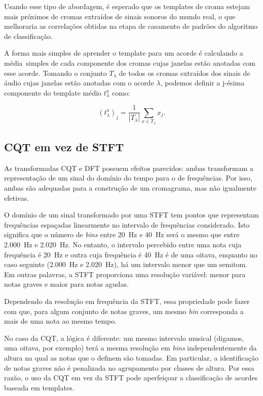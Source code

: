         Usando esse tipo de abordagem, é esperado que os templates de croma estejam mais próximos de cromas extraídos de sinais sonoros do mundo real, o que melhoraria as correlações obtidas na etapa de casamento de padrões do algoritmo de classificação.

        A forma mais simples de aprender o template para um acorde é calculando a média~simples de cada componente dos cromas cujas janelas estão anotadas com esse acorde. Tomando o conjunto $T_\lambda$ de todos os cromas extraídos dos sinais de áudio cujas janelas estão anotadas com o acorde $\lambda$, podemos definir a j-ésima componente do template médio $t_\lambda^a$ como:

        \[
            (t_\lambda^a)_j = \frac{1}{|T_\lambda|} \sum_{x \in T_\lambda} x_j\mbox{.}
        \]


    \subsection{CQT em vez de STFT}
        As transformadas CQT e DFT possuem efeitos parecidos: ambas transformam a representação de um sinal do domínio do tempo para o de frequências. Por isso, ambas são adequadas para a construção de um cromagrama, mas não igualmente efetivas.

        O domínio de um sinal transformado por uma STFT tem pontos que representam frequências espaçadas linearmente no intervalo de frequências considerado. Isto significa que o número de \textit{bins} entre 20~Hz e 40~Hz será o mesmo que entre 2.000~Hz e 2.020~Hz. No entanto, o intervalo percebido entre uma nota cuja frequência é 20~Hz e outra cuja frequência é 40~Hz é de uma oitava, enquanto no caso seguinte (2.000~Hz e 2.020~Hz), há um intervalo menor que um semitom. Em outras palavras, a STFT proporciona uma resolução variável: menor para notas graves e maior para notas agudas.

        Dependendo da resolução em frequência da STFT, essa propriedade pode fazer com que, para algum conjunto de notas graves, um mesmo \textit{bin} corresponda a mais de uma nota ao mesmo tempo.

        No caso da CQT, a lógica é diferente: um mesmo intervalo musical (digamos, uma oitava, por exemplo) terá a mesma resolução em \textit{bins} independentemente da altura na qual as notas que o definem são tomadas. Em particular, a identificação de notas graves não é penalizada no agrupamento por classes de altura.
        Por essa razão, o uso da CQT em vez da STFT pode aperfeiçoar a classificação de acordes baseada em templates.

